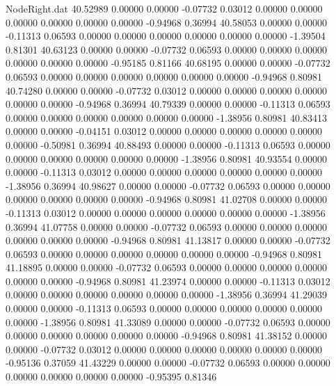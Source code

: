 \begin{filecontents}{NodeRight.dat}
  40.52989    0.00000    0.00000    -0.07732    0.03012    0.00000    0.00000    0.00000    0.00000    0.00000    0.00000   -0.94968    0.36994
  40.58053    0.00000    0.00000    -0.11313    0.06593    0.00000    0.00000    0.00000    0.00000    0.00000    0.00000   -1.39504    0.81301
  40.63123    0.00000    0.00000    -0.07732    0.06593    0.00000    0.00000    0.00000    0.00000    0.00000    0.00000   -0.95185    0.81166
  40.68195    0.00000    0.00000    -0.07732    0.06593    0.00000    0.00000    0.00000    0.00000    0.00000    0.00000   -0.94968    0.80981
  40.74280    0.00000    0.00000    -0.07732    0.03012    0.00000    0.00000    0.00000    0.00000    0.00000    0.00000   -0.94968    0.36994
  40.79339    0.00000    0.00000    -0.11313    0.06593    0.00000    0.00000    0.00000    0.00000    0.00000    0.00000   -1.38956    0.80981
  40.83413    0.00000    0.00000    -0.04151    0.03012    0.00000    0.00000    0.00000    0.00000    0.00000    0.00000   -0.50981    0.36994
  40.88493    0.00000    0.00000    -0.11313    0.06593    0.00000    0.00000    0.00000    0.00000    0.00000    0.00000   -1.38956    0.80981
  40.93554    0.00000    0.00000    -0.11313    0.03012    0.00000    0.00000    0.00000    0.00000    0.00000    0.00000   -1.38956    0.36994
  40.98627    0.00000    0.00000    -0.07732    0.06593    0.00000    0.00000    0.00000    0.00000    0.00000    0.00000   -0.94968    0.80981
  41.02708    0.00000    0.00000    -0.11313    0.03012    0.00000    0.00000    0.00000    0.00000    0.00000    0.00000   -1.38956    0.36994
  41.07758    0.00000    0.00000    -0.07732    0.06593    0.00000    0.00000    0.00000    0.00000    0.00000    0.00000   -0.94968    0.80981
  41.13817    0.00000    0.00000    -0.07732    0.06593    0.00000    0.00000    0.00000    0.00000    0.00000    0.00000   -0.94968    0.80981
  41.18895    0.00000    0.00000    -0.07732    0.06593    0.00000    0.00000    0.00000    0.00000    0.00000    0.00000   -0.94968    0.80981
  41.23974    0.00000    0.00000    -0.11313    0.03012    0.00000    0.00000    0.00000    0.00000    0.00000    0.00000   -1.38956    0.36994
  41.29039    0.00000    0.00000    -0.11313    0.06593    0.00000    0.00000    0.00000    0.00000    0.00000    0.00000   -1.38956    0.80981
  41.33089    0.00000    0.00000    -0.07732    0.06593    0.00000    0.00000    0.00000    0.00000    0.00000    0.00000   -0.94968    0.80981
  41.38152    0.00000    0.00000    -0.07732    0.03012    0.00000    0.00000    0.00000    0.00000    0.00000    0.00000   -0.95136    0.37059
  41.43229    0.00000    0.00000    -0.07732    0.06593    0.00000    0.00000    0.00000    0.00000    0.00000    0.00000   -0.95395    0.81346

\end{filecontents}
